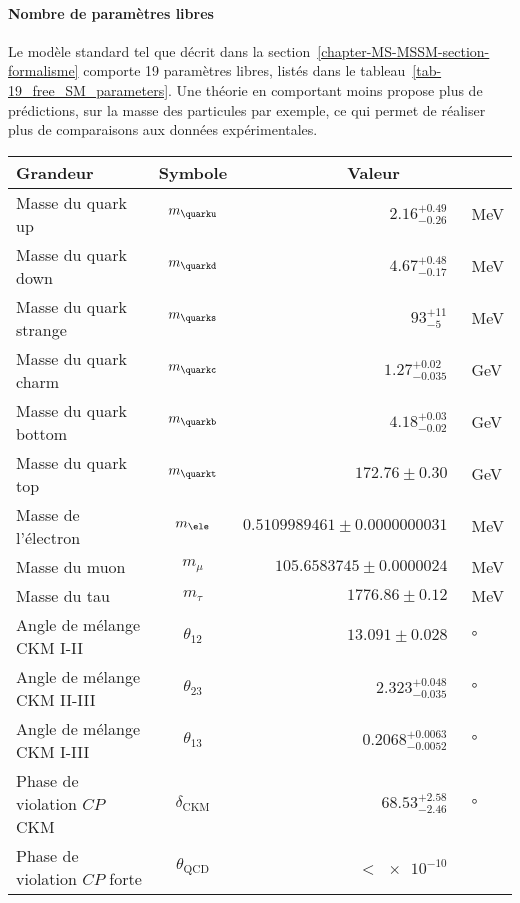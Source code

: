 \paragraph{Nombre de paramètres libres}
Le modèle standard tel que décrit dans la section~\ref{chapter-MS-MSSM-section-formalisme} comporte 19 paramètres libres, listés dans le tableau~\ref{tab-19_free_SM_parameters}.
Une théorie en comportant moins propose plus de prédictions, sur la masse des particules par exemple, ce qui permet de réaliser plus de comparaisons aux données expérimentales.
\begin{table}[h]
\centering
\begin{tabular}{lcrl}
\toprule
Grandeur & Symbole & \multicolumn{2}{c}{Valeur} \\
\midrule
Masse du quark up & $m_{\quarku}$ & $\num{2.16}^{+\num{0.49}}_{-\num{0.26}}$ & \SI{}{\MeV} \\
Masse du quark down & $m_{\quarkd}$ & $\num{4.67}^{+\num{0.48}}_{-\num{0.17}}$ & \SI{}{\MeV} \\
Masse du quark strange & $m_{\quarks}$ & $\num{93}^{+\num{11}}_{-\num{5}}$ & \SI{}{\MeV} \\
Masse du quark charm & $m_{\quarkc}$ & $\num{1.27}^{+\num{0.02}}_{-\num{0.035}}$ & \SI{}{\GeV} \\
Masse du quark bottom & $m_{\quarkb}$ & $\num{4.18}^{+\num{0.03}}_{-\num{0.02}}$ & \SI{}{\GeV} \\
Masse du quark top & $m_{\quarkt}$ & $\num{172.76}\pm\num{0.30}$ & \SI{}{\GeV} \\
Masse de l'électron & $m_{\ele}$ & $\num{0.5109989461}\pm\num{0.0000000031}$ & \SI{}{\MeV} \\
Masse du muon & $m_{\mu}$ & $\num{105.6583745}\pm\num{0.0000024}$ & \SI{}{\MeV} \\
Masse du tau & $m_{\tau}$ & $\num{1776.86}\pm\num{0.12}$ & \SI{}{\MeV} \\
Angle de mélange CKM I-II & $\theta_{12}$ & $\num{13.091}\pm\num{0.028}$ & \SI{}{\degree} \\
Angle de mélange CKM II-III & $\theta_{23}$ & $\num{2.323}^{+\num{0.048}}_{-\num{0.035}}$ & \SI{}{\degree} \\
Angle de mélange CKM I-III & $\theta_{13}$ & $\num{0.2068}^{+\num{0.0063}}_{-\num{0.0052}}$ & \SI{}{\degree} \\
Phase de violation $CP$ CKM & $\delta_{\text{CKM}}$ & $\num{68.53}^{+\num{2.58}}_{-\num{2.46}}$ & \SI{}{\degree} \\
Phase de violation $CP$ forte & $\theta_{\text{QCD}}$ & $<\num{e-10}$ & \\

\end{tabular}
\end{table}
